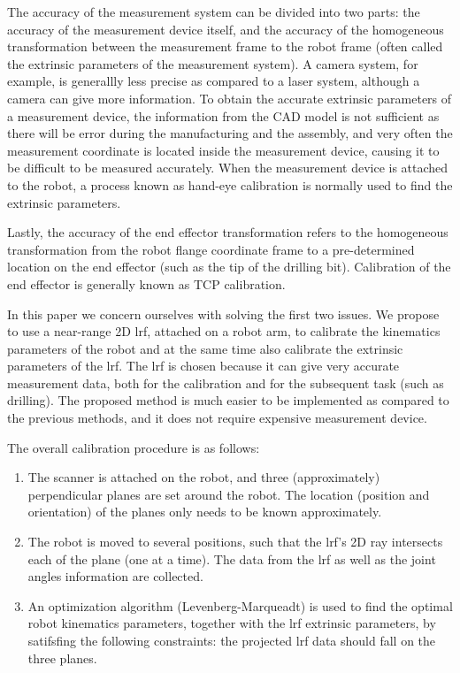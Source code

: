 The accuracy of the measurement system can be divided into two parts: the accuracy of the measurement device itself, and the accuracy of the homogeneous transformation between the measurement frame to the robot frame (often called the extrinsic parameters of the measurement system). A camera system, for example, is generallly less precise as compared to a laser system, although a camera can give more information. To obtain the accurate extrinsic parameters of a measurement device, the information from the CAD model is not sufficient as there will be error during the manufacturing and the assembly, and very often the measurement coordinate is located inside the measurement device, causing it to be difficult to be measured accurately. When the measurement device is attached to the robot, a process known as hand-eye calibration is normally used to find the extrinsic parameters. 

Lastly, the accuracy of the end effector transformation refers to the homogeneous transformation from the robot flange coordinate frame to a pre-determined location on the end effector (such as the tip of the drilling bit). Calibration of the end effector is generally known as TCP calibration. 

In this paper we concern ourselves with solving the first two issues. We propose to use a near-range 2D \ac{lrf}, attached on a robot arm, to calibrate the kinematics parameters of the robot and at the same time also calibrate the extrinsic parameters of the \ac{lrf}. The \ac{lrf} is chosen because it can give very accurate measurement data, both for the calibration and for the subsequent task (such as drilling). The proposed method is much easier to be implemented as compared to the previous methods, and it does not require expensive measurement device. 

The overall calibration procedure is as follows:
\begin{enumerate}
\item The scanner is attached on the robot, and three (approximately) perpendicular planes are set around the robot. The location (position and orientation) of the planes only needs to be known approximately.
\item The robot is moved to several positions, such that the \ac{lrf}'s 2D ray intersects each of the plane (one at a time). The data from the \ac{lrf} as well as the joint angles information are collected.
\item An optimization algorithm (Levenberg-Marqueadt) is used to find the optimal robot kinematics parameters, together with the \ac{lrf} extrinsic parameters, by satifsfing the following constraints: the projected \ac{lrf} data should fall on the three planes. 
\end{enumerate}

